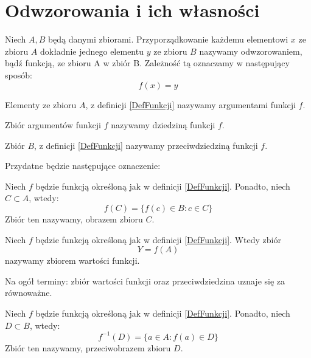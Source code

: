 \section{Odwzorowania i ich własności}
\begin{definicja}\label{DefFunkcji}
Niech $A,B$ będą danymi zbiorami. Przyporządkowanie każdemu elementowi $x$ ze zbioru $A$ dokładnie jednego elementu $y$ ze zbioru $B$ nazywamy odwzorowaniem, bądź funkcją, ze zbioru A w zbiór B. Zależność tą oznaczamy w następujący sposób: $$f(x)=y$$ 
\end{definicja}
\begin{definicja}
Elementy ze zbioru $A$, z definicji \ref{DefFunkcji} nazywamy argumentami  funkcji $f$.
\end{definicja}

\begin{definicja}
Zbiór argumentów funkcji $f$ nazywamy dziedziną  funkcji $f$.
\end{definicja}


\begin{definicja}
Zbiór $B$, z definicji \ref{DefFunkcji} nazywamy przeciwdziedziną  funkcji $f$.
\end{definicja}


Przydatne będzie następujące oznaczenie:
\begin{definicja}
Niech $f$ będzie funkcją określoną jak w definicji \ref{DefFunkcji}. Ponadto, niech $C \subset A$, wtedy:
$$f(C) = \{f(c) \in B : c \in C \} $$
Zbiór ten nazywamy, obrazem zbioru $C$.
\end{definicja}

\begin{definicja}
Niech $f$ będzie funkcją określoną jak w definicji \ref{DefFunkcji}. Wtedy zbiór
$$ Y = f(A) $$
nazywamy zbiorem wartości funkcji.
\end{definicja}

\begin{cor}
Na ogół terminy: zbiór wartości funkcji oraz przeciwdziedzina uznaje się za równoważne.
\end{cor}

\begin{definicja}
Niech $f$ będzie funkcją określoną jak w definicji \ref{DefFunkcji}. Ponadto, niech $D \subset B$, wtedy:
$$f^{-1}(D) = \{a \in A : f(a) \in D \} $$
Zbiór ten nazywamy, przeciwobrazem zbioru $D$.
\end{definicja}

